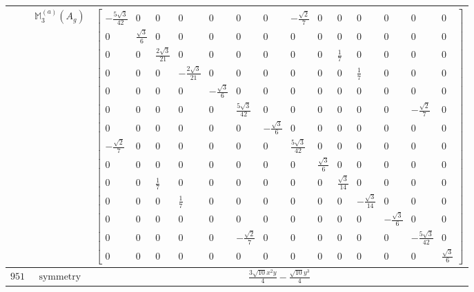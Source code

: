 \documentclass[fleqn,8pt,landscape]{jsarticle}
\begin{document}
\begin{longtable}{ccc}
$  $ & $ \mathbb{M}_{3}^{(a)}(A_{g}) $ & $ \begin{bmatrix} - \frac{5 \sqrt{3}}{42} & 0 & 0 & 0 & 0 & 0 & 0 & - \frac{\sqrt{2}}{7} & 0 & 0 & 0 & 0 & 0 & 0 \\ 0 & \frac{\sqrt{3}}{6} & 0 & 0 & 0 & 0 & 0 & 0 & 0 & 0 & 0 & 0 & 0 & 0 \\ 0 & 0 & \frac{2 \sqrt{3}}{21} & 0 & 0 & 0 & 0 & 0 & 0 & \frac{1}{7} & 0 & 0 & 0 & 0 \\ 0 & 0 & 0 & - \frac{2 \sqrt{3}}{21} & 0 & 0 & 0 & 0 & 0 & 0 & \frac{1}{7} & 0 & 0 & 0 \\ 0 & 0 & 0 & 0 & - \frac{\sqrt{3}}{6} & 0 & 0 & 0 & 0 & 0 & 0 & 0 & 0 & 0 \\ 0 & 0 & 0 & 0 & 0 & \frac{5 \sqrt{3}}{42} & 0 & 0 & 0 & 0 & 0 & 0 & - \frac{\sqrt{2}}{7} & 0 \\ 0 & 0 & 0 & 0 & 0 & 0 & - \frac{\sqrt{3}}{6} & 0 & 0 & 0 & 0 & 0 & 0 & 0 \\ - \frac{\sqrt{2}}{7} & 0 & 0 & 0 & 0 & 0 & 0 & \frac{5 \sqrt{3}}{42} & 0 & 0 & 0 & 0 & 0 & 0 \\ 0 & 0 & 0 & 0 & 0 & 0 & 0 & 0 & \frac{\sqrt{3}}{6} & 0 & 0 & 0 & 0 & 0 \\ 0 & 0 & \frac{1}{7} & 0 & 0 & 0 & 0 & 0 & 0 & \frac{\sqrt{3}}{14} & 0 & 0 & 0 & 0 \\ 0 & 0 & 0 & \frac{1}{7} & 0 & 0 & 0 & 0 & 0 & 0 & - \frac{\sqrt{3}}{14} & 0 & 0 & 0 \\ 0 & 0 & 0 & 0 & 0 & 0 & 0 & 0 & 0 & 0 & 0 & - \frac{\sqrt{3}}{6} & 0 & 0 \\ 0 & 0 & 0 & 0 & 0 & - \frac{\sqrt{2}}{7} & 0 & 0 & 0 & 0 & 0 & 0 & - \frac{5 \sqrt{3}}{42} & 0 \\ 0 & 0 & 0 & 0 & 0 & 0 & 0 & 0 & 0 & 0 & 0 & 0 & 0 & \frac{\sqrt{3}}{6} \end{bmatrix} $ \\ \hline
$ 951 $ & $ \text{symmetry} $ & $ \frac{3 \sqrt{10} x^{2} y}{4} - \frac{\sqrt{10} y^{3}}{4} $ \\

\end{longtable}
\end{document}
